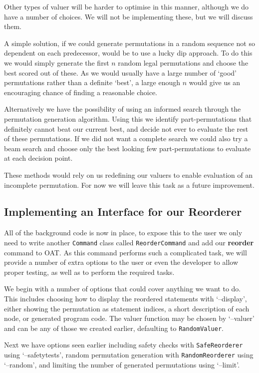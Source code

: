 \documentclass[twoside,a4paper]{report}
\begin{document}
Other types of valuer will be harder to optimise in this manner, although we do have a number of choices. We will not be implementing these, but we will
discuss them.

A simple solution, if we could generate permutations in a random sequence not so dependent on each predecessor, would be to use a lucky dip approach. To do
this we would simply generate the first $n$ random legal permutations and choose the best scored out of these. As we would usually have a large number of
`good' permutations rather than a definite `best', a large enough $n$ would give us an encouraging chance of finding a reasonable choice.

Alternatively we have the possibility of using an informed search through the permutation generation algorithm. Using this we identify part-permutations that
definitely cannot beat our current best, and decide not ever to evaluate the rest of these permutations. If we did not want a complete search we could also
try a beam search and choose only the best looking few part-permutations to evaluate at each decision point.

These methods would rely on us redefining our valuers to enable evaluation of an incomplete permutation. For now we will leave this task as a future improvement.

\subsection{Implementing an Interface for our Reorderer}

All of the background code is now in place, to expose this to the user we only need to write another \texttt{Command} class called \texttt{ReorderCommand} and
add our \textbf{reorder} command to OAT. As this command performs such a complicated task, we will provide a number of extra options to the user or even the
developer to allow proper testing, as well as to perform the required tasks.

We begin with a number of options that could cover anything we want to do. This includes choosing how to display the reordered statements with `--display',
either showing the permutation as statement indices, a short description of each node, or generated program code. The valuer function may be chosen by
`--valuer' and can be any of those we created earlier, defaulting to \texttt{RandomValuer}.

Next we have options seen earlier including safety checks with \texttt{SafeReorderer} using `--safetytests', random permutation generation with
\texttt{RandomReorderer} using `--random',  and limiting the number of generated permutations using `--limit'.
\end{document}
